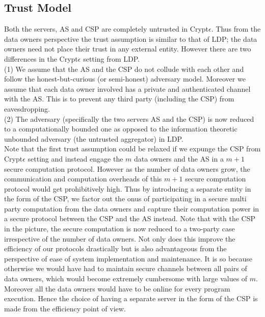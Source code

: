 \subsection{Trust Model}
Both the servers, \textsf{AS} and \textsf{CSP} are completely untrusted in Crypt$\epsilon$. 
Thus from the data owners perspective the trust assumption is similar to that of \textsf{LDP}; the data owners need not place their trust in any external entity. 
However there are two differences in the Crypt$\epsilon$ setting from \textsf{LDP}.\\
 (1) We assume that the \textsf{AS} and the \textsf{CSP} do not collude with each other and follow the honest-but-curious (or semi-honest) adversary model. %
 Moreover we assume that each data owner involved has a private and authenticated channel with the \textsf{AS}. This is to prevent any third party (including the \textsf{CSP}) from eavesdropping. \\
 (2) The adversary (specifically the two servers \textsf{AS} and the \textsf{CSP}) is now reduced to a computationally bounded one as opposed to the information theoretic unbounded adversary (the untrusted aggregator) in \textsf{LDP}.\\
Note that the first trust assumption could be relaxed if we expunge the \textsf{CSP} from Crypt$\epsilon$ setting and instead engage the $m$ data owners and the \textsf{AS} in a $m+1$ secure computation protocol. However as the number of data owners grow, the communication and computation overheads of this $m+1$ secure computation protocol would get prohibitively high. Thus by introducing a separate entity in the form of the \textsf{CSP}, we factor out the onus of participating in a secure multi party computation from the data owners and capture their computation power in a secure protocol between the \textsf{CSP} and the \textsf{AS} instead. Note that with the \textsf{CSP} in the picture, the secure computation is now reduced to a two-party case irrespective of the number of data owners. Not only does this improve the efficiency of our protocols drastically but is also advantageous from the perspective of ease of system implementation and maintenance. It is so because otherwise we would have had to maintain secure channels between all pairs of data owners, which would become extremely cumbersome with large values of $m$. Moreover all the data owners would have to be online for every program execution. Hence the choice of having a separate server in the form of the \textsf{CSP} is made from the efficiency point of view.
